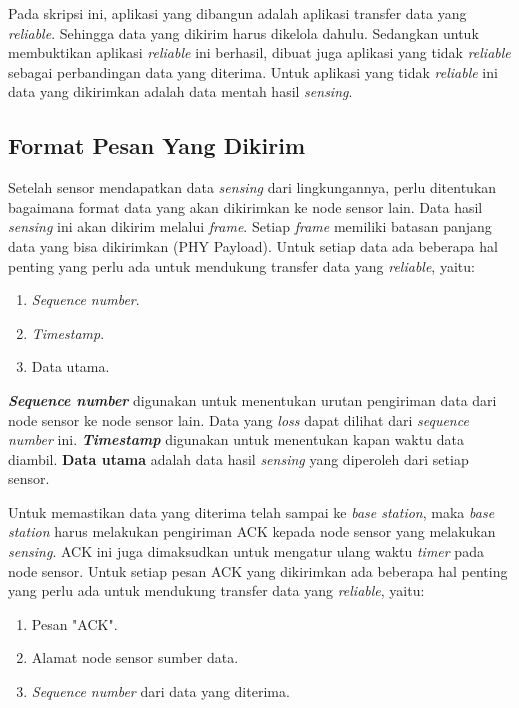 Pada skripsi ini, aplikasi yang dibangun adalah aplikasi transfer data yang \textit{reliable}. Sehingga data yang dikirim harus dikelola dahulu. Sedangkan untuk membuktikan aplikasi \textit{reliable} ini berhasil, dibuat juga aplikasi yang tidak \textit{reliable} sebagai perbandingan data yang diterima. Untuk aplikasi yang tidak \textit{reliable} ini data yang dikirimkan adalah data mentah hasil \textit{sensing}.

\subsection{Format Pesan Yang Dikirim}
\label{sub:formatPesan}
Setelah sensor mendapatkan data \textit{sensing} dari lingkungannya, perlu ditentukan bagaimana format data yang akan dikirimkan ke node sensor lain. Data hasil \textit{sensing} ini akan dikirim melalui \textit{frame}. Setiap \textit{frame} memiliki batasan panjang data yang bisa dikirimkan (PHY Payload). Untuk setiap data ada beberapa hal penting yang perlu ada untuk mendukung transfer data yang \textit{reliable}, yaitu:
\begin{enumerate}
    \item \textit{Sequence number}.
    \item \textit{Timestamp}.
    \item Data utama.
\end{enumerate}
 
\textbf{\textit{Sequence number}} digunakan untuk menentukan urutan pengiriman data dari node sensor ke node sensor lain. Data yang \textit{loss} dapat dilihat dari \textit{sequence number} ini. \textbf{\textit{Timestamp}} digunakan untuk menentukan kapan waktu data diambil. \textbf{Data utama} adalah data hasil \textit{sensing} yang diperoleh dari setiap sensor.

Untuk memastikan data yang diterima telah sampai ke \textit{base station}, maka \textit{base station} harus melakukan pengiriman ACK kepada node sensor yang melakukan \textit{sensing}. ACK ini juga dimaksudkan untuk mengatur ulang waktu \textit{timer} pada node sensor. Untuk setiap pesan ACK yang dikirimkan ada beberapa hal penting yang perlu ada untuk mendukung transfer data yang \textit{reliable}, yaitu:
\begin{enumerate}
    \item Pesan "ACK".
    \item Alamat node sensor sumber data.
    \item \textit{Sequence number} dari data yang diterima.
\end{enumerate}


